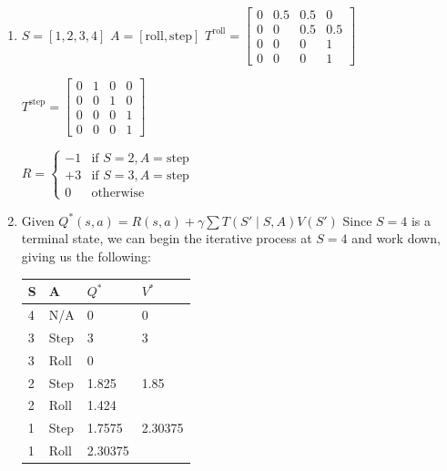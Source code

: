 \documentclass[11pt]{article}
\begin{document}
\begin{enumerate}[label=\alph*)]
    \item 
    \( S = [1,2,3,4]\) \newline
    \(A = [\mathrm{roll}, \mathrm{step}]\) \newline
    \( T^{\mathrm{roll}} = 
        \begin{bmatrix}
            0 & 0.5 & 0.5 & 0 \\
            0 & 0 & 0.5 & 0.5 \\
            0 & 0 & 0 & 1 \\
            0 & 0 & 0 & 1 
        \end{bmatrix}
    \)

    \(
        T^{\mathrm{step}} = 
        \begin{bmatrix}
            0 & 1 & 0 & 0 \\
            0 & 0 & 1 & 0 \\
            0 & 0 & 0 & 1 \\
            0 & 0 & 0 & 1 
        \end{bmatrix}
    \) \newline

    \(
        R = \begin{cases}
        -1 & \text{if } S = 2, A = \mathrm{step} \\
        +3 & \text{if } S = 3, A = \mathrm{step} \\
        0 &  \mathrm{otherwise}
        \end{cases}
    \)

    \item
    
    Given $Q^*(s,a) = R(s,a) + \gamma  \sum T(S' \mid S,A ) V(S')$\newline
    Since $S = 4$ is a terminal state, we can begin the iterative process at $S=4$ and work down, giving 
    us the following:

    \begin{tabular}{|l|l|l|l|}
    \hline
    S & A    & $Q^*$ & $V^*$ \\ \hline
    4 & N/A  & 0                  & 0                    \\ \hline
    3 & Step & 3                    & 3                    \\ \hline
    3 & Roll & 0                    &                      \\ \hline
    2 & Step & 1.825                & 1.85                 \\ \hline
    2 & Roll & 1.424                &                      \\ \hline
    1 & Step & 1.7575               & 2.30375              \\ \hline
    1 & Roll & 2.30375              &                      \\ \hline
    \end{tabular}


\end{enumerate}
\end{document}
